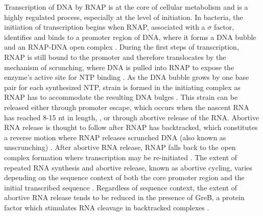 %
Transcription of DNA by RNAP is at the core of cellular metabolism and is a
highly regulated process, especially at the level of initiation. In bacteria,
the initiation of transcription begins when RNAP, associated with a $\sigma$
factor, identifies and binds to a promoter region of DNA, where it forms a DNA
bubble and an RNAP-DNA open complex \cite{saecker_mechanism_2011}. During the
first steps of transcription, RNAP is still bound to the promoter and
therefore translocates by the mechanism of scrunching, where DNA is pulled
into RNAP to expose the enzyme's active site for NTP binding
\cite{revyakin_abortive_2006, kapanidis_initial_2006}. As the DNA bubble grows
by one base pair for each synthesized NTP, strain is formed in the initiating
complex as RNAP has to accommodate the resulting DNA bulges
\cite{straney_stressed_1987, kapanidis_initial_2006,
winkelman_crosslink_2015}. This strain can be released either through promoter
escape, which occurs when the nascent RNA has
reached 8-15 nt in length, \cite{carpousis_cycling_1980,
hsu_vitro_2003, tang_real-time_2009, hsu_initial_2006}, or through abortive
release of the RNA. Abortive RNA release is thought to follow after RNAP has
backtracked, which constitutes a reverse motion where RNAP releases scrunched
DNA (also known as unscrunching) \cite{hsu_escherichia_1995,
feng_grea-induced_1994, hsu_initial_2006}. After abortive RNA release, RNAP
falls back to the open complex formation where transcription may be
re-initiated \cite{carpousis_cycling_1980}. The extent of repeated RNA
synthesis and abortive release, known as abortive cycling, varies depending on
the sequence context of both the core promoter region and the initial
transcribed sequence \cite{hsu_initial_2006, hsu_promoter_2002, vo_vitro_2003,
skancke_sequence-dependent_2015}. Regardless of sequence context, the extent
of abortive RNA release tends to be reduced in the presence of GreB, a protein
factor which stimulates RNA cleavage in backtracked complexes
\cite{hsu_initial_2006}.

